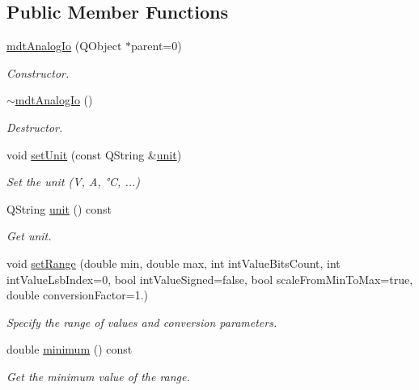 \subsection*{Public Member Functions}
\begin{DoxyCompactItemize}
\item 
\hyperlink{classmdt_analog_io_affcdf039a10023b495cf49a5f476f829}{mdt\-Analog\-Io} (Q\-Object $\ast$parent=0)
\begin{DoxyCompactList}\small\item\em Constructor. \end{DoxyCompactList}\item 
\hyperlink{classmdt_analog_io_a7ec3c075b1d49c2d0917c09e4950b856}{$\sim$mdt\-Analog\-Io} ()
\begin{DoxyCompactList}\small\item\em Destructor. \end{DoxyCompactList}\item 
void \hyperlink{classmdt_analog_io_afb4cd82bee1ac1e77148c8621b1c66fa}{set\-Unit} (const Q\-String \&\hyperlink{classmdt_analog_io_a126d5b9bf4a0bb9ce9f2ff6a010fef0e}{unit})
\begin{DoxyCompactList}\small\item\em Set the unit (V, A, °\-C, ...) \end{DoxyCompactList}\item 
Q\-String \hyperlink{classmdt_analog_io_a126d5b9bf4a0bb9ce9f2ff6a010fef0e}{unit} () const 
\begin{DoxyCompactList}\small\item\em Get unit. \end{DoxyCompactList}\item 
void \hyperlink{classmdt_analog_io_a7ce54314b02625aa45aa3e48c4855948}{set\-Range} (double min, double max, int int\-Value\-Bits\-Count, int int\-Value\-Lsb\-Index=0, bool int\-Value\-Signed=false, bool scale\-From\-Min\-To\-Max=true, double conversion\-Factor=1.)
\begin{DoxyCompactList}\small\item\em Specify the range of values and conversion parameters. \end{DoxyCompactList}\item 
double \hyperlink{classmdt_analog_io_acd2b8cb33d5d42abf23672ad7675825e}{minimum} () const 
\begin{DoxyCompactList}\small\item\em Get the minimum value of the range. \end{DoxyCompactList}\item 

\end{DoxyCompactItemize}
